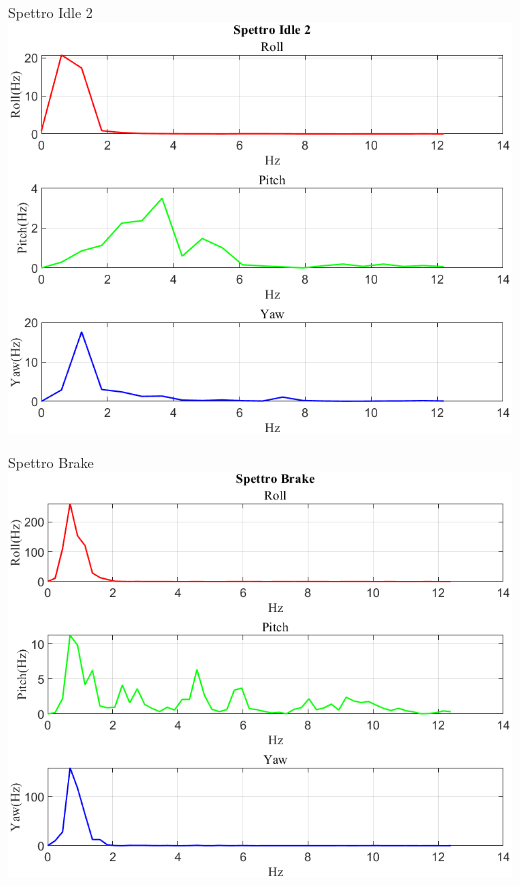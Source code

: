 \documentclass[beamer]{standalone}
\begin{document}
	\begin{frame}{{Spettro Idle 2}}
		\centering\includegraphics[height=.8\textheight]{figure/VAng/Trasformata/Spettro Idle 2}
	\end{frame}
	
	\begin{frame}{{Spettro Brake}}
		\centering\includegraphics[height=.8\textheight]{figure/VAng/Trasformata/Spettro Brake}
	\end{frame}
	
\end{document}
